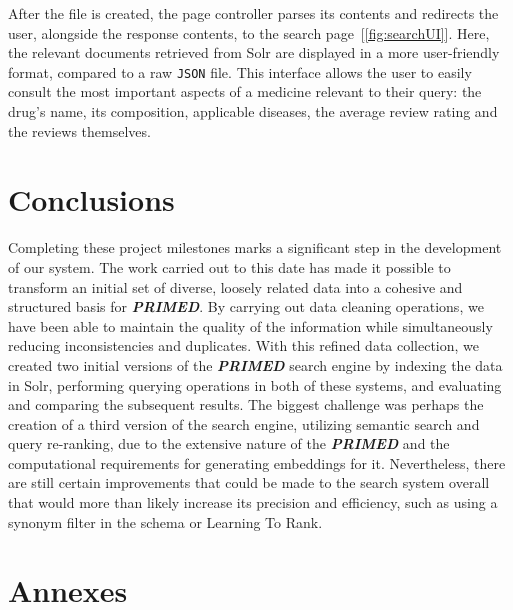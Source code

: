 \documentclass[sigconf]{acmart}
\begin{document}
After the file is created, the page controller parses its contents and redirects the user, alongside the response contents, to the search page~[\ref{fig:searchUI}]. Here, the relevant documents retrieved from Solr are displayed in a more user-friendly format, compared to a raw \texttt{JSON} file. This interface allows the user to easily consult the most important aspects of a medicine relevant to their query: the drug's name, its composition, applicable diseases, the average review rating and the reviews themselves.

\section{Conclusions}

Completing these project milestones marks a significant step in the development of our system. The work carried out to this date has made it possible to transform an initial set of diverse, loosely related data into a cohesive and structured basis for \textit{\textbf{PRIMED}}. By carrying out data cleaning operations, we have been able to maintain the quality of the information while simultaneously reducing inconsistencies and duplicates. With this refined data collection, we created two initial versions of the \textit{\textbf{PRIMED}} search engine by indexing the data in Solr, performing querying operations in both of these systems, and evaluating and comparing the subsequent results. The biggest challenge was perhaps the creation of a third version of the search engine, utilizing semantic search and query re-ranking, due to the extensive nature of the \textit{\textbf{PRIMED}} and the computational requirements for generating embeddings for it. Nevertheless, there are still certain improvements that could be made to the search system overall that would more than likely increase its precision and efficiency, such as using a synonym filter in the schema or Learning To Rank.




\appendix
\section{Annexes}
\end{document}
